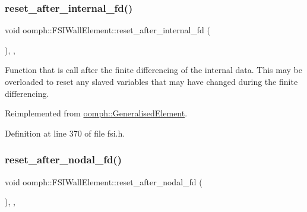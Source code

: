 \mbox{\label{classoomph_1_1FSIWallElement_ab0229ea34afffcd6d85a10dafa0b7d10}} 
\subsubsection{\texorpdfstring{reset\+\_\+after\+\_\+internal\+\_\+fd()}{reset\_after\_internal\_fd()}}
{\footnotesize\ttfamily void oomph\+::\+F\+S\+I\+Wall\+Element\+::reset\+\_\+after\+\_\+internal\+\_\+fd (\begin{DoxyParamCaption}{ }\end{DoxyParamCaption})\hspace{0.3cm}{\ttfamily [inline]}, {\ttfamily [protected]}, {\ttfamily [virtual]}}



Function that is call after the finite differencing of the internal data. This may be overloaded to reset any slaved variables that may have changed during the finite differencing. 



Reimplemented from \hyperlink{classoomph_1_1GeneralisedElement_ab3e2e13d219c132488fb05e9596cb43f}{oomph\+::\+Generalised\+Element}.



Definition at line 370 of file fsi.\+h.

\mbox{\label{classoomph_1_1FSIWallElement_a24734c8730cf96234ee2317dd123b19e}} 
\subsubsection{\texorpdfstring{reset\+\_\+after\+\_\+nodal\+\_\+fd()}{reset\_after\_nodal\_fd()}}
{\footnotesize\ttfamily void oomph\+::\+F\+S\+I\+Wall\+Element\+::reset\+\_\+after\+\_\+nodal\+\_\+fd (\begin{DoxyParamCaption}{ }\end{DoxyParamCaption})\hspace{0.3cm}{\ttfamily [inline]}, {\ttfamily [protected]}, {\ttfamily [virtual]}}



